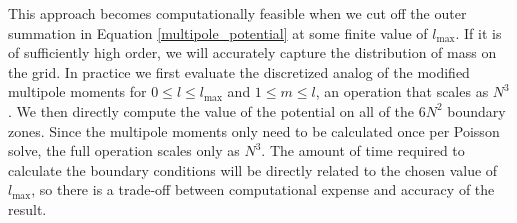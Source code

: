 \documentclass[iop]{emulateapj}
\begin{document}

This approach becomes computationally feasible when we cut off the
outer summation in Equation \ref{multipole_potential} at some finite
value of $l_{\text{max}}$. If it is of sufficiently high order, we
will accurately capture the distribution of mass on the grid. In
practice we first evaluate the discretized analog of the modified
multipole moments for $0 \leq l \leq l_{\text{max}}$ and $1 \leq m
\leq l$, an operation that scales as $N^3$. We then directly compute
the value of the potential on all of the $6N^2$ boundary zones. Since
the multipole moments only need to be calculated once per Poisson
solve, the full operation scales only as $N^3$. The amount of time
required to calculate the boundary conditions will be directly related
to the chosen value of $l_{\text{max}}$, so there is a trade-off
between computational expense and accuracy of the result.
\end{document}
